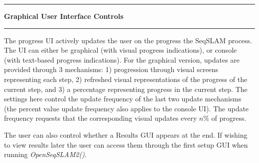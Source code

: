 \noindent\rule{\textwidth}{1pt}
\indent \textbf{Graphical User Interface Controls}
\noindent\rule{\textwidth}{1pt}
\smallskip
\parbox{\textwidth}{The progress UI actively updates the user on the progress the SeqSLAM process. The UI can either be graphical (with visual progress indications), or console (with text-based progress indications). For the graphical version, updates are provided through 3 mechanisms: 1) progression through visual screens representing each step, 2) refreshed visual representations of the progress of the current step, and 3) a percentage representing progress in the current step. The settings here control the update frequency of the last two update mechanisms (the percent value update frequency also applies to the console UI). The update frequency requests that the corresponding visual updates every $n\%$ of progress.}
\bigskip
\parbox{\textwidth}{The user can also control whether a Results GUI appears at the end. If wishing to view results later the user can access them through the first setup GUI when running \textit{OpenSeqSLAM2()}.}
